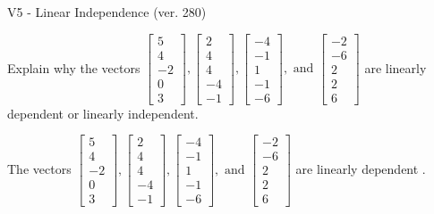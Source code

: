 \begin{exercise}
  \begin{exerciseTitle}V5 - Linear Independence (ver. 280)\end{exerciseTitle}
  \begin{exerciseStatement}
    Explain why the vectors \(\left[\begin{array}{r}
5 \\
4 \\
-2 \\
0 \\
3
\end{array}\right] , \left[\begin{array}{r}
2 \\
4 \\
4 \\
-4 \\
-1
\end{array}\right] , \left[\begin{array}{r}
-4 \\
-1 \\
1 \\
-1 \\
-6
\end{array}\right] , \text{ and } \left[\begin{array}{r}
-2 \\
-6 \\
2 \\
2 \\
6
\end{array}\right]\) are linearly dependent or linearly independent.	


  \end{exerciseStatement}
  \begin{exerciseAnswer}
   The vectors \(\left[\begin{array}{r}
5 \\
4 \\
-2 \\
0 \\
3
\end{array}\right] , \left[\begin{array}{r}
2 \\
4 \\
4 \\
-4 \\
-1
\end{array}\right] , \left[\begin{array}{r}
-4 \\
-1 \\
1 \\
-1 \\
-6
\end{array}\right] , \text{ and } \left[\begin{array}{r}
-2 \\
-6 \\
2 \\
2 \\
6
\end{array}\right]\) are 
  	 linearly dependent  .
  


  \end{exerciseAnswer}
\end{exercise}